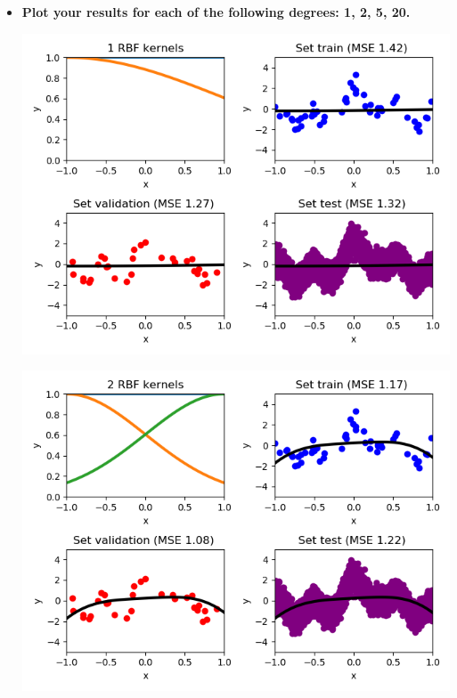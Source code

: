 \documentclass[a4paper]{article}
\begin{document}
\vspace{10pt}
\begin{itemize}
\item \textbf{Plot your results for each of the following degrees: 1, 2, 5, 20.}\\

\begin{minipage}[b]{0.4\textwidth}
  \vspace{10pt}
  \includegraphics[scale=0.35]{plots/plot_rbf_degree1.png}
 \captionsetup{justification=centering}
  \label{plot_rbf_degree1}
\end{minipage}
\hfill
\begin{minipage}[b]{0.4\textwidth}
  \includegraphics[scale=0.35]{plots/plot_rbf_degree2.png}
 \captionsetup{justification=centering}
  \label{plot_rbf_degree2}
\end{minipage}


\end{itemize}
\end{document}
